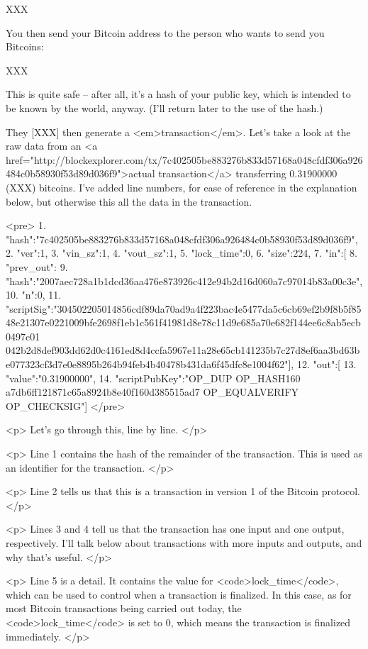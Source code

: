 XXX

You then send your Bitcoin address to the person who wants to send you
Bitcoins:

XXX

This is quite safe -- after all, it's a hash of your public key, which
is intended to be known by the world, anyway.  (I'll return later to
the use of the hash.)

They [XXX] then generate a <em>transaction</em>.  Let's take a look at
the raw data from an <a
href="http://blockexplorer.com/tx/7c402505be883276b833d57168a048cfdf306a926484c0b58930f53d89d036f9">actual
transaction</a> transferring $0.31900000$ (XXX) bitcoins.  I've added
line numbers, for ease of reference in the explanation below, but
otherwise this all the data in the transaction.

<pre>
1.  {"hash":"7c402505be883276b833d57168a048cfdf306a926484c0b58930f53d89d036f9",
2.  "ver":1,
3.  "vin_sz":1,
4.  "vout_sz":1,
5.  "lock_time":0,
6.  "size":224,
7.  "in":[
8.    {"prev_out":
9.      {"hash":"2007aec728a1b1dcd36aa476e873926c412e94b2d16d060a7c97014b83a00c3e",
10.      "n":0},
11.    "scriptSig":"304502205014856cdf89da70ad9a4f223bac4e5477da5c6cb69ef2b9f8b5f8548e21307e0221009bfe2698f1eb1c561f41981d8e78c11d9e685a70e682f144ee6c8ab5ecb0497c01 042b2d8def903dd62d0c4161ed8d4ccfa5967e11a28e65cb141235b7c27d8ef6aa3bd63be077323cf3d7e0e8895b264b94feb4b40478b431da6f45dfc8e1004f62"}],
12. "out":[
13.   {"value":"0.31900000",
14.    "scriptPubKey":"OP_DUP OP_HASH160 a7db6ff121871c65a8924b8e40f160d385515ad7 OP_EQUALVERIFY OP_CHECKSIG"}]}
</pre>

<p>
Let's go through this, line by line.
</p>

<p>
Line 1 contains the hash of the remainder of the transaction.  This is
used as an identifier for the transaction.
</p>

<p>
Line 2 tells us that this is a transaction in version 1 of the Bitcoin
protocol.
</p>

<p>
Lines 3 and 4 tell us that the transaction has one input and one
output, respectively.  I'll talk below about transactions with more
inputs and outputs, and why that's useful.
</p>


<p>
Line 5 is a detail.  It contains the value for <code>lock_time</code>,
which can be used to control when a transaction is finalized.  In this
case, as for most Bitcoin transactions being carried out today, the
<code>lock_time</code> is set to 0, which means the transaction is
finalized immediately.
</p>

